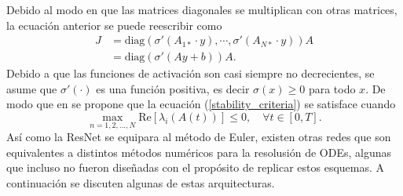 Debido al modo en que las matrices diagonales se multiplican con otras matrices, la ecuación anterior se puede reescribir como 
\begin{align}
   J &= \text{diag}(\sigma'(A_{1*}\cdot y), \cdots, \sigma'(A_{N*}\cdot y))A \\
   &=  \text{diag}(\sigma'(Ay + b)) A.
\end{align}
Debido a que las funciones de activación son casi siempre no decrecientes, se asume que $\sigma'(\cdot) $ es una función positiva, es decir $\sigma(x) \geq 0$ para todo $x$. De modo que en \cite{stable_resnets} se propone que la ecuación (\ref{stability_criteria}) se satisface cuando 
\begin{equation}
   \label{stability_criteria2}
   \max_{n=1,2, ..., N} \text{Re}[\lambda_i(A(t))] \leq 0, \quad \forall t\in [0,T].
\end{equation}
Así como la ResNet se equipara al método de Euler, existen otras redes que son equivalentes a distintos métodos numéricos para la resolusión de ODEs, algunas que incluso no fueron diseñadas con el propósito de replicar estos esquemas. A continuación se discuten algunas de estas arquitecturas.
